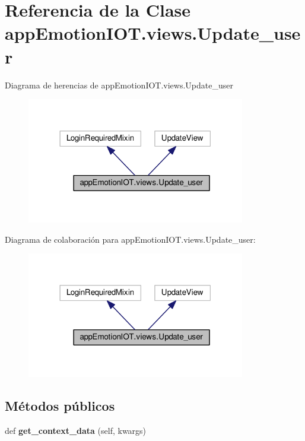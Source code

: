 \hypertarget{classappEmotionIOT_1_1views_1_1Update__user}{}\section{Referencia de la Clase app\+Emotion\+I\+O\+T.\+views.\+Update\+\_\+user}
\label{classappEmotionIOT_1_1views_1_1Update__user}


Diagrama de herencias de app\+Emotion\+I\+O\+T.\+views.\+Update\+\_\+user
\nopagebreak
\begin{figure}[H]
\begin{center}
\leavevmode
\includegraphics[width=270pt]{classappEmotionIOT_1_1views_1_1Update__user__inherit__graph}
\end{center}
\end{figure}


Diagrama de colaboración para app\+Emotion\+I\+O\+T.\+views.\+Update\+\_\+user\+:
\nopagebreak
\begin{figure}[H]
\begin{center}
\leavevmode
\includegraphics[width=270pt]{classappEmotionIOT_1_1views_1_1Update__user__coll__graph}
\end{center}
\end{figure}
\subsection*{Métodos públicos}
\begin{DoxyCompactItemize}
\item 
def {\bfseries get\+\_\+context\+\_\+data} (self, kwargs)\hypertarget{classappEmotionIOT_1_1views_1_1Update__user_ae3965cdf162b1671fa6b482b50c557dd}{}\label{classappEmotionIOT_1_1views_1_1Update__user_ae3965cdf162b1671fa6b482b50c557dd}

\end{DoxyCompactItemize}
